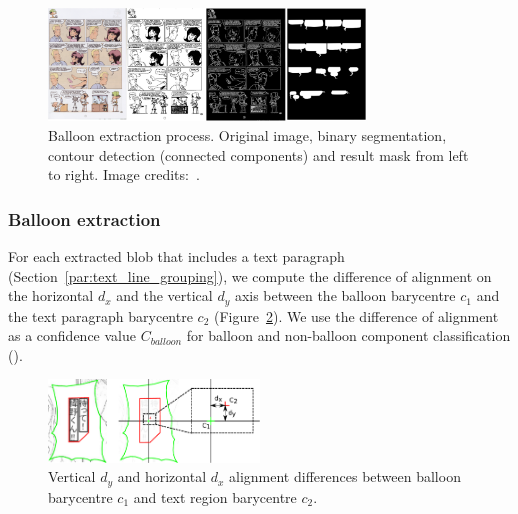 	\begin{figure}[h!]	%
	  \centering
		\includegraphics[trim= 0px 0px 0px 0px, clip, width=0.75\textwidth]{closed_balloon_process.png}
		\caption[Sequential balloon extraction process illustration]{Balloon extraction process. Original image, binary segmentation, contour detection (connected components) and result mask from left to right. Image credits:~\cite{Midam01}. }
		\label{fig:se:closed_balloon}
	\end{figure}




\subsubsection{Balloon extraction} %
\label{par:balloon_extraction}

For each extracted blob that includes a text paragraph (Section~\ref{par:text_line_grouping}), we compute the difference of alignment on the horizontal $d_x$ and the vertical $d_y$ axis between the balloon barycentre $c_1$ and the text paragraph barycentre $c_2$ (Figure~\ref{fig:se:align_diff}).
We use the difference of alignment as a confidence value $C_{balloon}$ for balloon and non-balloon component classification ().

	\begin{figure}[h!]	%
	  \centering
		\includegraphics[trim= 140px 0px 0px 0px, clip, width=0.5\textwidth]{text_balloon_alignment.pdf}
		\caption[Illustration of the vertical and horizontal alignment differences between balloon and text region barycentre]{Vertical $d_y$ and horizontal $d_x$ alignment differences between balloon barycentre $c_1$ and text region barycentre $c_2$.}
		\label{fig:se:align_diff}
	\end{figure}

